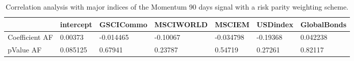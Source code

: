\begin{table}[H]
\centering
\begin{tabular}{lllllll}
\hline& intercept & GSCICommo & MSCIWORLD & MSCIEM & USDindex & GlobalBonds \\ 
\hline 
Coefficient AF & 0.00373 & -0.014465 & -0.10067 & -0.034798 & -0.19368 & 0.042238 \\ 
pValue AF & 0.085125 & 0.67941 & 0.23787 & 0.54719 & 0.27261 & 0.82117 \\ 
\hline
\end{tabular}
\caption{Correlation analysis with major indices of the Momentum 90 days signal with a risk parity weighting scheme.}
\label{MOM90RP_AFACTOR}
\end{table}